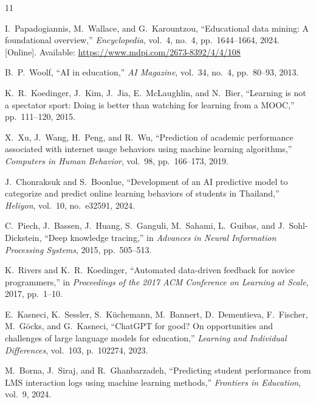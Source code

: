 \documentclass[conference]{IEEEtran}
\begin{document}
\begin{thebibliography}{11}

I.~Papadogiannis, M.~Wallace, and G.~Karountzou,
``Educational data mining: A foundational overview,''
\emph{Encyclopedia}, vol.~4, no.~4, pp.~1644--1664, 2024.
[Online]. Available: \url{https://www.mdpi.com/2673-8392/4/4/108}


B.~P.~Woolf,
``AI in education,''
\emph{AI Magazine}, vol.~34, no.~4, pp.~80--93, 2013.

K.~R.~Koedinger, J.~Kim, J.~Jia, E.~McLaughlin, and N.~Bier,
``Learning is not a spectator sport: Doing is better than watching for learning from a MOOC,''
pp.~111--120, 2015.

X.~Xu, J.~Wang, H.~Peng, and R.~Wu,
``Prediction of academic performance associated with internet usage behaviors using machine learning algorithms,''
\emph{Computers in Human Behavior}, vol.~98, pp.~166--173, 2019.

J.~Chonraksuk and S.~Boonlue,
``Development of an AI predictive model to categorize and predict online learning behaviors of students in Thailand,''
\emph{Heliyon}, vol.~10, no.~e32591, 2024.

C.~Piech, J.~Bassen, J.~Huang, S.~Ganguli, M.~Sahami, L.~Guibas, and
J.~Sohl-Dickstein,
``Deep knowledge tracing,''
in \emph{Advances in Neural Information Processing Systems}, 2015,
pp.~505--513.

K.~Rivers and K.~R.~Koedinger,
``Automated data-driven feedback for novice programmers,''
in \emph{Proceedings of the 2017 ACM Conference on Learning at Scale}, 2017,
pp.~1--10.

E.~Kasneci, K.~Sessler, S.~K\"{u}chemann, M.~Bannert, D.~Dementieva,
F.~Fischer, M.~G\"{o}cks, and G.~Kasneci,
``ChatGPT for good? On opportunities and challenges of large language models for education,''
\emph{Learning and Individual Differences}, vol.~103, p.~102274, 2023.

M.~Borna, J.~Siraj, and R.~Ghanbarzadeh,
``Predicting student performance from LMS interaction logs using machine learning methods,''
\emph{Frontiers in Education}, vol.~9, 2024.

\end{thebibliography}
\end{document}
